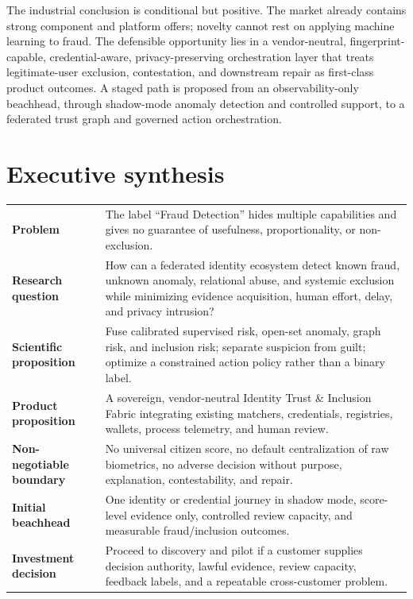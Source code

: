 The industrial conclusion is conditional but positive. The market already contains strong component and platform offers; novelty cannot rest on applying machine learning to fraud. The defensible opportunity lies in a vendor-neutral, fingerprint-capable, credential-aware, privacy-preserving orchestration layer that treats legitimate-user exclusion, contestation, and downstream repair as first-class product outcomes. A staged path is proposed from an observability-only beachhead, through shadow-mode anomaly detection and controlled support, to a federated trust graph and governed action orchestration.

\vspace{1em}
\claimboundary

\chapter*{Executive synthesis}

\begin{tabularx}{\textwidth}{>{\bfseries\color{TrustNavy}}p{34mm}Y}
Problem & The label ``Fraud Detection'' hides multiple capabilities and gives no guarantee of usefulness, proportionality, or non-exclusion.\\
Research question & How can a federated identity ecosystem detect known fraud, unknown anomaly, relational abuse, and systemic exclusion while minimizing evidence acquisition, human effort, delay, and privacy intrusion?\\
Scientific proposition & Fuse calibrated supervised risk, open-set anomaly, graph risk, and inclusion risk; separate suspicion from guilt; optimize a constrained action policy rather than a binary label.\\
Product proposition & A sovereign, vendor-neutral Identity Trust \& Inclusion Fabric integrating existing matchers, credentials, registries, wallets, process telemetry, and human review.\\
Non-negotiable boundary & No universal citizen score, no default centralization of raw biometrics, no adverse decision without purpose, explanation, contestability, and repair.\\
Initial beachhead & One identity or credential journey in shadow mode, score-level evidence only, controlled review capacity, and measurable fraud/inclusion outcomes.\\
Investment decision & Proceed to discovery and pilot if a customer supplies decision authority, lawful evidence, review capacity, feedback labels, and a repeatable cross-customer problem.\\
\end{tabularx}

